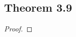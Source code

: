 \documentclass[../../main.tex]{subfiles}
\begin{document}
\subsection{Theorem 3.9}
\begin{wts}

\end{wts}
\begin{proof}

\end{proof}
\end{document}
